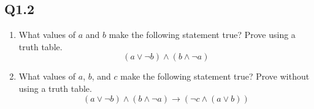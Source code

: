 \documentclass{article}
\begin{document}
\subsection*{Q1.2}
\begin{enumerate}[label=\alph*.]
    \item What values of $a$ and $b$ make the following statement true? Prove using a truth table.
    $$(a \lor \neg b) \land (b \land \neg a)$$
    \item What values of $a$, $b$, and $c$ make the following statement true? Prove without using a truth table.
    $$(a \lor \neg b) \land (b \land \neg a)\rightarrow (\neg c\land(a \lor b))$$
\end{enumerate}
\newpage
\end{document}
